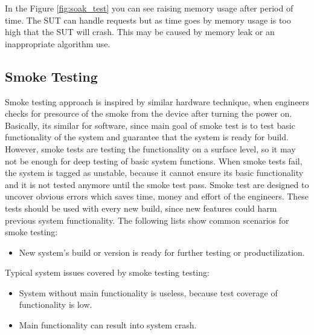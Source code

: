 In the Figure \ref{fig:soak_test} you can see raising memory usage after period of time. The SUT can handle requests but as time goes by memory usage is too high that the SUT will crash. This may be caused by memory leak or an inappropriate algorithm use.

\subsection*{Smoke Testing}
Smoke testing approach is inspired by similar hardware technique, when engineers checks for presource of the smoke from the device after turning the power on. Basically, its similar for software, since main goal of smoke test is to test basic functionality of the system and guarantee that the system is ready for build. However, smoke tests are testing the functionality on a surface level, so it may not be enough for deep testing of basic system functions. When smoke tests fail, the system is tagged as unstable, because it cannot ensure its basic functionality and it is not tested anymore until the smoke test pass. Smoke test are designed to uncover obvious errors which saves time, money and effort of the engineers. These tests should be used with every new build, since new features could harm previous system functionality.
The following lists show common scenarios for smoke testing:
\begin{itemize}
	\setlength\itemsep{0em}
	\item New system's build or version is ready for further testing or productilization.
\end{itemize}
Typical system issues covered by smoke testing testing:
\begin{itemize}
	\setlength\itemsep{0em}
	\item System without main functionality is useless, because test coverage of functionality is low.
	\item Main functionality can result into system crash.
\end{itemize} 


